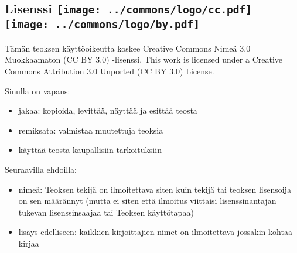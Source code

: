 \subsection*{Lisenssi \texttt{[image: ../commons/logo/cc.pdf]} \texttt{[image: ../commons/logo/by.pdf]}}

Tämän teoksen käyttöoikeutta koskee Creative Commons Nimeä 3.0 Muokkaamaton (CC BY 3.0) -lisenssi.
This work is licensed under a Creative Commons Attribution 3.0 Unported (CC BY 3.0) License.


Sinulla on vapaus:
\begin{itemize}
\item jakaa: kopioida, levittää, näyttää ja esittää teosta
\item remiksata: valmistaa muutettuja teoksia
\item käyttää teosta kaupallisiin tarkoituksiin
\end{itemize}
Seuraavilla ehdoilla:
\begin{itemize}
\item nimeä: Teoksen tekijä on ilmoitettava siten kuin tekijä tai teoksen lisensoija on sen määrännyt (mutta ei siten että ilmoitus viittaisi lisenssinantajan tukevan lisenssinsaajaa tai Teoksen käyttötapaa)
\item lisäys edelliseen: kaikkien kirjoittajien nimet on ilmoitettava jossakin kohtaa kirjaa
\end{itemize}
